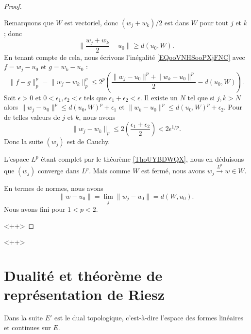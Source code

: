 \begin{proof}
\begin{subproof}
            Remarquons que \( W\) est vectoriel, donc \( (w_j+w_k)/2\) est dans \( W\) pour tout \( j\) et \( k\); donc
            \begin{equation}
                \| \frac{ w_j+w_k }{2}-u_0 \|\geq d(u_0,W).
            \end{equation}
            En tenant compte de cela, nous écrivons l'inégalité \eqref{EQooVNHSooPXjFNC} avec \( f=w_j-u_0\) et \( g=w_k-u_0\) :
            \begin{equation}
                \| f-g \|_p^p=\| w_j-w_k \|_p^p\leq 2^p\left( \frac{ \| w_j-u_0 \|^p+\| w_k-u_0 \|^p }{2}-d(u_0,W) \right).
            \end{equation}
            Soit \( \epsilon>0\) et \( 0<\epsilon_1,\epsilon_2<\epsilon\) tels que \( \epsilon_1+\epsilon_2<\epsilon\). Il existe un \( N\) tel que si \( j,k>N\) alors \( \| w_j-u_0 \|^p\leq d(u_0,W)^p+\epsilon_1\) et \( \| w_k-u_0 \|^p\leq d(u_0,W)^p+\epsilon_2\). Pour de telles valeurs de \( j\) et \( k\), nous avons
            \begin{equation}
                \| w_j-w_k \|_p\leq 2\left( \frac{ \epsilon_1+\epsilon_2 }{2} \right)<2\epsilon^{1/p}.
            \end{equation}
            Donc la suite \( (w_j)\) est de Cauchy.

            L'espace \( L^p\) étant complet par le théorème \ref{ThoUYBDWQX}, nous en déduisons que \( (w_j)\) converge dans \( L^p\). Mais comme \( W\) est fermé, nous avons \( w_j\stackrel{L^p}{\longrightarrow}w\in W\).

            En termes de normes, nous avons
            \begin{equation}
                \| w-u_0 \|=\lim_j\| w_j-u_0 \|=d(W,u_0).
            \end{equation}
            Nous avons fini pour \( 1<p<2\).
    \end{subproof}
    <++>
\end{proof}
<++>

\section{Dualité et théorème de représentation de Riesz}

Dans la suite \( E'\) est le dual topologique, c'est-à-dire l'espace des formes linéaires et continues sur \( E\).


